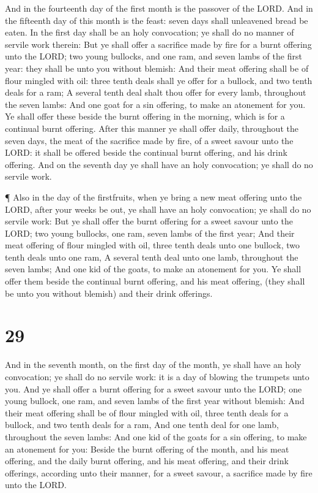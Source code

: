  And in the fourteenth day of the first month is the
passover of the LORD.  And in the fifteenth day of this
month is the feast: seven days shall unleavened bread be eaten.
 In the first day shall be an holy convocation; ye shall do
no manner of servile work therein:  But ye shall offer a
sacrifice made by fire for a burnt offering unto the LORD; two young
bullocks, and one ram, and seven lambs of the first year: they shall be
unto you without blemish:  And their meat offering shall be
of flour mingled with oil: three tenth deals shall ye offer for a
bullock, and two tenth deals for a ram;  A several tenth
deal shalt thou offer for every lamb, throughout the seven lambs:
 And one goat for a sin offering, to make an atonement for
you.  Ye shall offer these beside the burnt offering in the
morning, which is for a continual burnt offering.  After
this manner ye shall offer daily, throughout the seven days, the meat of
the sacrifice made by fire, of a sweet savour unto the LORD: it shall be
offered beside the continual burnt offering, and his drink offering.
 And on the seventh day ye shall have an holy convocation;
ye shall do no servile work.

 ¶ Also in the day of the firstfruits, when ye bring a new
meat offering unto the LORD, after your weeks be out, ye shall have an
holy convocation; ye shall do no servile work:  But ye
shall offer the burnt offering for a sweet savour unto the LORD; two
young bullocks, one ram, seven lambs of the first year; 
And their meat offering of flour mingled with oil, three tenth deals
unto one bullock, two tenth deals unto one ram,  A several
tenth deal unto one lamb, throughout the seven lambs;  And
one kid of the goats, to make an atonement for you.  Ye
shall offer them beside the continual burnt offering, and his meat
offering, (they shall be unto you without blemish) and their drink
offerings.

\hypertarget{section-28}{%
\section{29}\label{section-28}}

 And in the seventh month, on the first day of the month, ye
shall have an holy convocation; ye shall do no servile work: it is a day
of blowing the trumpets unto you.  And ye shall offer a
burnt offering for a sweet savour unto the LORD; one young bullock, one
ram, and seven lambs of the first year without blemish:  And
their meat offering shall be of flour mingled with oil, three tenth
deals for a bullock, and two tenth deals for a ram,  And one
tenth deal for one lamb, throughout the seven lambs:  And
one kid of the goats for a sin offering, to make an atonement for you:
 Beside the burnt offering of the month, and his meat
offering, and the daily burnt offering, and his meat offering, and their
drink offerings, according unto their manner, for a sweet savour, a
sacrifice made by fire unto the LORD.

